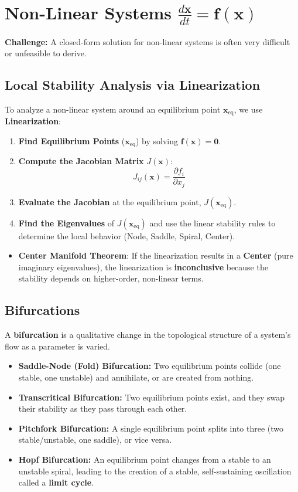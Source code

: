 \documentclass{report}
\begin{document}
\section*{Non-Linear Systems $\frac{d\mathbf{x}}{dt} = \mathbf{f}(\mathbf{x})$}

\textbf{Challenge:} A closed-form solution for non-linear systems is often very difficult or unfeasible to derive.

\subsection*{Local Stability Analysis via Linearization}
To analyze a non-linear system around an equilibrium point $\mathbf{x}_{\text{eq}}$, we use \textbf{Linearization}:

\begin{enumerate}
    \item \textbf{Find Equilibrium Points} ($\mathbf{x}_{\text{eq}}$) by solving $\mathbf{f}(\mathbf{x}) = \mathbf{0}$.
    \item \textbf{Compute the Jacobian Matrix} $J(\mathbf{x})$:
    \[
    J_{ij}(\mathbf{x}) = \frac{\partial f_i}{\partial x_j}
    \]
    \item \textbf{Evaluate the Jacobian} at the equilibrium point, $J(\mathbf{x}_{\text{eq}})$.
    \item \textbf{Find the Eigenvalues} of $J(\mathbf{x}_{\text{eq}})$ and use the linear stability rules to determine the local behavior (Node, Saddle, Spiral, Center).
\end{enumerate}

\begin{itemize}
    \item \textbf{Center Manifold Theorem}: If the linearization results in a \textbf{Center} (pure imaginary eigenvalues), the linearization is \textbf{inconclusive} because the stability depends on higher-order, non-linear terms.
\end{itemize}

\subsection*{Bifurcations}
A \textbf{bifurcation} is a qualitative change in the topological structure of a system's flow as a parameter is varied.

\begin{itemize}
    \item \textbf{Saddle-Node (Fold) Bifurcation:} Two equilibrium points collide (one stable, one unstable) and annihilate, or are created from nothing.
    \item \textbf{Transcritical Bifurcation:} Two equilibrium points exist, and they swap their stability as they pass through each other.
    \item \textbf{Pitchfork Bifurcation:} A single equilibrium point splits into three (two stable/unstable, one saddle), or vice versa.
    \item \textbf{Hopf Bifurcation:} An equilibrium point changes from a stable to an unstable spiral, leading to the creation of a stable, self-sustaining oscillation called a \textbf{limit cycle}.
\end{itemize}
\end{document}
